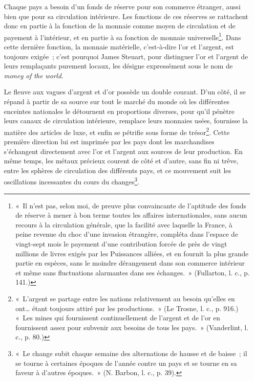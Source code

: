 \documentclass[french,twoside]{book} %
\begin{document}
Chaque pays a besoin d’un fonds de réserve pour son commerce étranger, aussi bien que pour sa circulation intérieure. Les fonctions de ces réserves se rattachent donc en partie à la fonction de la monnaie comme moyen de circulation et de payement à l’intérieur, et en partie à sa fonction de monnaie universelle\footnote{« Il n’est pas, selon moi, de preuve plus convaincante de l’aptitude des fonds de réserve à mener à bon terme toutes les affaires internationales, sans aucun recours à la circulation générale, que la facilité avec laquelle la France, à peine revenue du choc d’une invasion étrangère, compléta dans l’espace de vingt‑sept mois le payement d’une contribution forcée de près de vingt millions de livres exigés par les Puissances alliées, et en fournit la plus grande partie en espèces, sans le moindre dérangement dans son commerce intérieur et même sans fluctuations alarmantes dans ses échanges. » (Fullarton, l. c., p. 141.)}. Dans cette dernière fonction, la monnaie matérielle, c’est‑à‑dire l’or et l’argent, est toujours exigée ; c’est pourquoi James Steuart, pour distinguer l’or et l’argent de leurs remplaçants purement locaux, les désigne expressément sous le nom de \emph{money of the world.}\par
Le fleuve aux vagues d’argent et d’or possède un double courant. D’un côté, il se répand à partir de sa source sur tout le marché du monde où les différentes enceintes nationales le détournent en proportions diverses, pour qu’il pénètre leurs canaux de circulation intérieure, remplace leurs monnaies usées, fournisse la matière des articles de luxe, et enfin se pétrifie sous forme de trésor\footnote{« L’argent se partage entre les nations relativement au besoin qu’elles en ont… étant toujours attiré par les productions. » (Le Trosne, l. c., p. 916.) « Les mines qui fournissent continuellement de l’argent et de l’or en fournissent assez pour subvenir aux besoins de tous les pays. » (Vanderlint, l. c., p. 80.)}. Cette première direction lui est imprimée par les pays dont les marchandises s’échangent directement avec l’or et l’argent aux sources de leur production. En même temps, les métaux précieux courent de côté et d’autre, sans fin ni trêve, entre les sphères de circulation des différents pays, et ce mouvement suit les oscillations incessantes du cours du changes\footnote{« Le change subit chaque semaine des alternations de hausse et de baisse ; il se tourne à certaines époques de l’année contre un pays et se tourne en sa faveur à d’autres époques. » (N. Barbon, l. c., p. 39).}.\par
\end{document}
